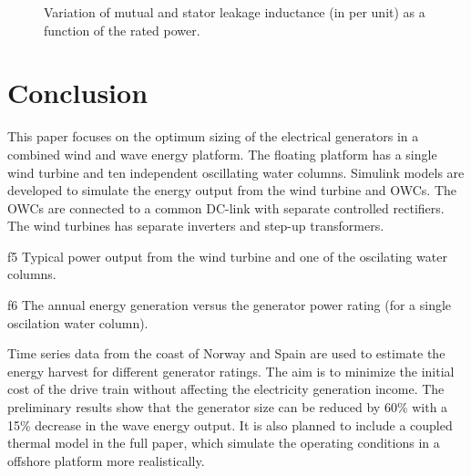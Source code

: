 \documentclass[twocolumn]{article}
\begin{document}
\begin{figure}[]
  \centering

    \caption{Variation of mutual and stator leakage inductance (in per unit) as a function of the rated power.} 
    \label{inductance_plots}
\end{figure}


\section{Conclusion}

This paper focuses on the optimum sizing of the electrical generators in a combined wind and wave energy platform. The floating platform has a single wind turbine and ten independent oscillating water columns. Simulink models are developed to simulate the energy output from the wind turbine and OWCs. The OWCs are connected to a common DC-link with separate controlled rectifiers. The wind turbines has separate inverters and step-up transformers.

{f5} Typical power output from the wind turbine and one of the oscilating water columns.

{f6} The annual energy generation versus the generator power rating (for a single oscilation water column).

Time series data from the coast of Norway and Spain are used to estimate the energy harvest for different generator ratings. The aim is to minimize the initial cost of the drive train without affecting the electricity generation income. The preliminary results show that the generator size can be reduced by 60\% with a 15\% decrease in the wave energy output. It is also planned to include a coupled thermal model in the full paper, which simulate the operating conditions in a offshore platform more realistically.
\end{document}
